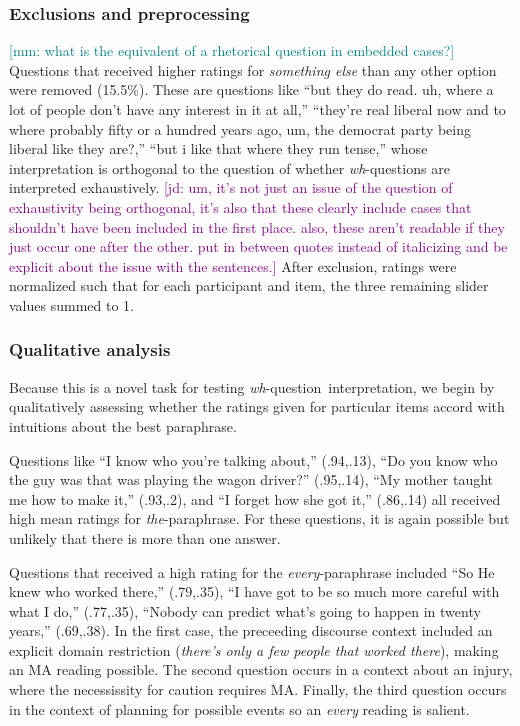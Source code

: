 \documentclass[12pt,letterpaper,table,svgnames,dvipsnames]{article}
\newcommand{\jd}[1]{\textcolor{Purple}{[jd: #1]}}
\newcommand{\mm}[1]{\textcolor{teal}{[mm: #1]}}
\newcommand{\whq}{\emph{wh}-question~}
\begin{document}
\subsubsection{Exclusions and preprocessing}
\mm{what is the equivalent of a rhetorical question in embedded cases?}
Questions that received higher ratings for \emph{something else} than any other option were removed (15.5\%). These are questions like 
``but they do read. uh, where a lot of people don't have any interest in it at all,'' 
``they're real liberal now and to where probably fifty or a hundred years ago, um, the democrat party being liberal like they are?,'' 
``but i like that where they run tense,'' 
whose interpretation is orthogonal to the question of whether \emph{wh}-questions are interpreted exhaustively. \jd{um, it's not just an issue of the question of exhaustivity being orthogonal, it's also that these clearly include cases that shouldn't have been included in the first place. also, these aren't readable if they just occur one after the other. put in between quotes instead of italicizing and be explicit about the issue with the sentences.} After exclusion, ratings were normalized such that for each participant and item, the three remaining slider values summed to 1.  

\subsubsection{Qualitative analysis}
Because this is a novel task for testing \whq interpretation, we begin by qualitatively assessing whether the ratings given for particular items accord with intuitions about the best paraphrase.

Questions like 
``I know who you’re talking about,'' (.94,.13), 
``Do you know who the guy was that was playing the wagon driver?'' (.95,.14), 
``My mother taught me how to make it,'' (.93,.2), and
``I forget how she got it,'' (.86,.14) 
all received high mean ratings for \emph{the}-paraphrase. For these questions, it is again possible but unlikely that there is more than one answer.

Questions that received a high rating for the \emph{every}-paraphrase included 
``So He knew who worked there,'' (.79,.35), 
``I have got to be so much more careful with what I do,'' (.77,.35), 
``Nobody can predict what's going to happen in twenty years,'' (.69,.38).
In the first case, the preceeding discourse context included an explicit domain restriction (\emph{there's only a few people that worked there}), making an MA reading possible. The second question occurs in a context about an injury, where the necessissity for caution requires MA. Finally, the third question occurs in the context of planning for possible events so an \emph{every} reading is salient.
\end{document}
